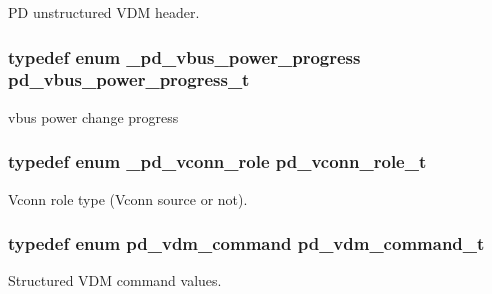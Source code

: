 P\-D unstructured V\-D\-M header. 

\hypertarget{group__usb__pd__stack_ga9fe9a91f20a573620c9cc1263d7c77e4}{
\subsubsection[{pd\-\_\-vbus\-\_\-power\-\_\-progress\-\_\-t}]{\setlength{\rightskip}{0pt plus 5cm}typedef enum {\bf \-\_\-pd\-\_\-vbus\-\_\-power\-\_\-progress}  {\bf pd\-\_\-vbus\-\_\-power\-\_\-progress\-\_\-t}}}\label{group__usb__pd__stack_ga9fe9a91f20a573620c9cc1263d7c77e4}


vbus power change progress 

\hypertarget{group__usb__pd__stack_ga1e7a5e660ff0837fe23286556a20d4eb}{
\subsubsection[{pd\-\_\-vconn\-\_\-role\-\_\-t}]{\setlength{\rightskip}{0pt plus 5cm}typedef enum {\bf \-\_\-pd\-\_\-vconn\-\_\-role}  {\bf pd\-\_\-vconn\-\_\-role\-\_\-t}}}\label{group__usb__pd__stack_ga1e7a5e660ff0837fe23286556a20d4eb}


Vconn role type (Vconn source or not). 

\hypertarget{group__usb__pd__stack_gabd6b0763d01e2d65501af70e4f67b039}{
\subsubsection[{pd\-\_\-vdm\-\_\-command\-\_\-t}]{\setlength{\rightskip}{0pt plus 5cm}typedef enum {\bf pd\-\_\-vdm\-\_\-command}  {\bf pd\-\_\-vdm\-\_\-command\-\_\-t}}}\label{group__usb__pd__stack_gabd6b0763d01e2d65501af70e4f67b039}


Structured V\-D\-M command values. 

